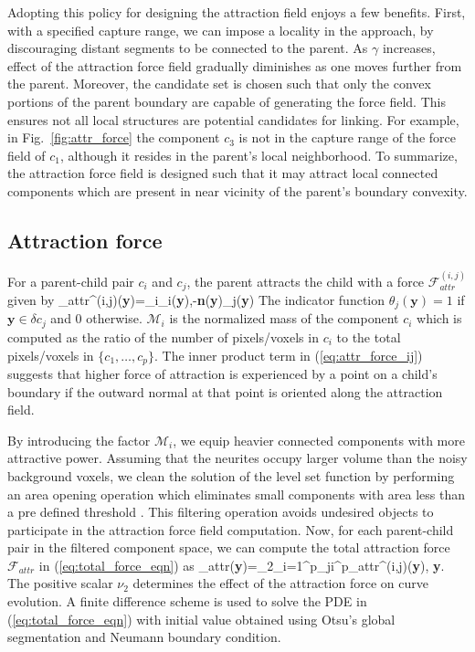 Adopting this policy for designing the attraction field enjoys a few benefits. First, with a specified capture range, we can impose a locality in the approach, by discouraging distant segments to be connected to the parent. As $\gamma$ increases, effect of the attraction force field gradually diminishes as one moves further from the parent. Moreover, the candidate set is chosen such that only the convex portions of the parent boundary are capable of generating the force field. This ensures not all local structures are potential candidates for linking. For example, in Fig.~\ref{fig:attr_force} the component $c_3$ is not in the capture range of the force field of $c_1$, although it resides in the parent's local neighborhood. To summarize, the attraction force field is designed such that it may attract local connected components which are present in near vicinity of the parent's boundary convexity.  

\subsection{Attraction force}
For a parent-child pair $c_i$ and $c_j$, the parent attracts the child with a force $\mathcal{F}_{attr}^{(i,j)}$ given by
\bea
{}_{attr}^{(i,j)}(\textbf{y})=_i\langle \Gamma_i(\textbf{y}),-\textbf{n}(\textbf{y})\rangle \theta_j(\textbf{y})
\label{eq:attr_force_ij}
\eea
The indicator function $\theta_j(\textbf{y})=1$ if $\textbf{y}\in \delta c_j$ and $0$ otherwise. $\mathcal{M}_i$ is the normalized mass of the component $c_i$ which is computed as the ratio of the number of pixels/voxels in $c_i$ to the total pixels/voxels in $\{c_1,\ldots,c_p\}$. The inner product term in (\ref{eq:attr_force_ij}) suggests that higher force of attraction is experienced by a point on a child's boundary if the outward normal at that point is oriented along the attraction field.  


By introducing the factor $\mathcal{M}_i$, we equip heavier connected components with more attractive power.
Assuming that the neurites occupy larger volume than the noisy background voxels, we clean the solution of the level set function by performing an area opening operation which eliminates small components with area less than a pre defined threshold \cite{acton_fast}. This filtering operation avoids undesired objects to participate in the attraction force field computation. Now, for each parent-child pair in the filtered component space, we can compute the total attraction force $\mathcal{F}_{attr}$ in (\ref{eq:total_force_eqn}) as
\bea
{}_{attr}(\textbf{y})=\nu_2\sum_{i=1}^{p}\sum_{j\neq i}^{p}_{attr}^{(i,j)}(\textbf{y}),\quad
\forall \textbf{y}\in \Omega.
\label{eq:total_attr_force}
\eea
The positive scalar $\nu_2$ determines the effect of the attraction force on curve evolution. A finite difference scheme is used to solve the PDE in (\ref{eq:total_force_eqn}) with initial value obtained using Otsu's global segmentation \cite{otsu} and Neumann boundary condition. 

